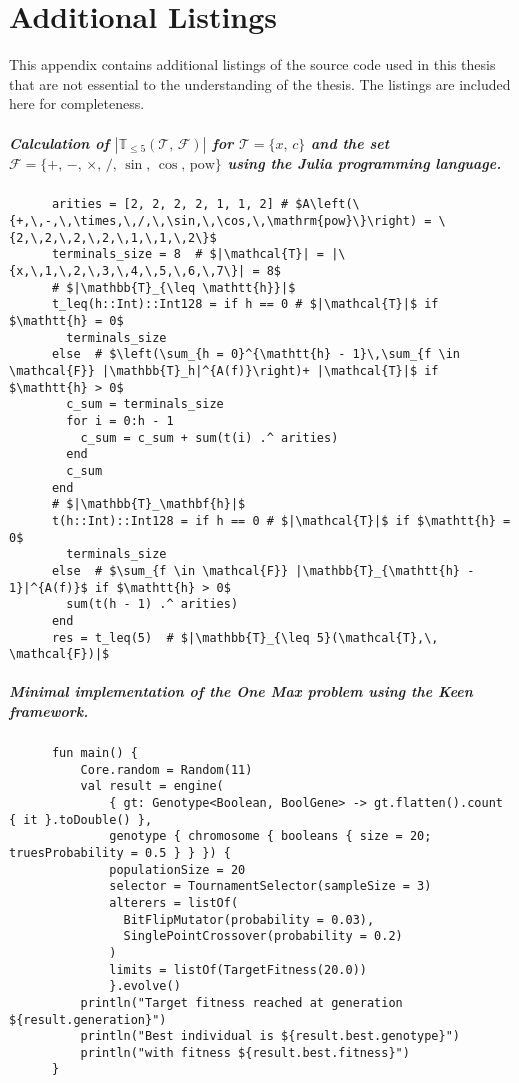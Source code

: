\chapter{Additional Listings}
\label{app:Listings}
  This appendix contains additional listings of the source code used in this
  thesis that are not essential to the understanding of the thesis.
  The listings are included here for completeness.
  
  \paragraph{
    Calculation of \(|\mathbb{T}_{\leq 5}(\mathcal{T},\, \mathcal{F})|\) for 
    \(\mathcal{T} = \{x,\, c\}\) and the set \(\mathcal{F} = \{+,\, -,\, 
    \times,\, /,\, \sin,\, \cos,\, \mathrm{pow}\}\) using the \textit{Julia}
    programming language.
  }
  \label{lst:cardinality_of_T_leq_5}
    \begin{verbatim}
      arities = [2, 2, 2, 2, 1, 1, 2] # $A\left(\{+,\,-,\,\times,\,/,\,\sin,\,\cos,\,\mathrm{pow}\}\right) = \{2,\,2,\,2,\,2,\,1,\,1,\,2\}$
      terminals_size = 8  # $|\mathcal{T}| = |\{x,\,1,\,2,\,3,\,4,\,5,\,6,\,7\}| = 8$
      # $|\mathbb{T}_{\leq \mathtt{h}}|$
      t_leq(h::Int)::Int128 = if h == 0 # $|\mathcal{T}|$ if $\mathtt{h} = 0$
        terminals_size
      else  # $\left(\sum_{h = 0}^{\mathtt{h} - 1}\,\sum_{f \in \mathcal{F}} |\mathbb{T}_h|^{A(f)}\right)+ |\mathcal{T}|$ if $\mathtt{h} > 0$
        c_sum = terminals_size
        for i = 0:h - 1
          c_sum = c_sum + sum(t(i) .^ arities)
        end
        c_sum
      end
      # $|\mathbb{T}_\mathbf{h}|$
      t(h::Int)::Int128 = if h == 0 # $|\mathcal{T}|$ if $\mathtt{h} = 0$
        terminals_size
      else  # $\sum_{f \in \mathcal{F}} |\mathbb{T}_{\mathtt{h} - 1}|^{A(f)}$ if $\mathtt{h} > 0$
        sum(t(h - 1) .^ arities) 
      end
      res = t_leq(5)  # $|\mathbb{T}_{\leq 5}(\mathcal{T},\, \mathcal{F})|$
    \end{verbatim}
  \paragraph{
    Minimal implementation of the \textit{One Max} problem using the 
    \textit{Keen} framework.
  }
  \label{lst:app:keen_one_max}
    \begin{verbatim}
      fun main() {
          Core.random = Random(11)
          val result = engine(
              { gt: Genotype<Boolean, BoolGene> -> gt.flatten().count { it }.toDouble() },
              genotype { chromosome { booleans { size = 20; truesProbability = 0.5 } } }) {
              populationSize = 20
              selector = TournamentSelector(sampleSize = 3)
              alterers = listOf(
                BitFlipMutator(probability = 0.03),
                SinglePointCrossover(probability = 0.2)
              )
              limits = listOf(TargetFitness(20.0))
              }.evolve()
          println("Target fitness reached at generation ${result.generation}")
          println("Best individual is ${result.best.genotype}")
          println("with fitness ${result.best.fitness}")
      }
    \end{verbatim}